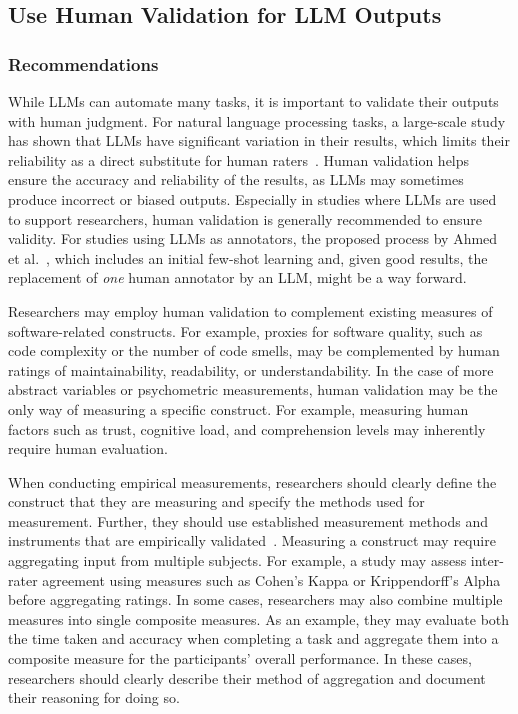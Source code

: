 \documentclass[11pt]{article}
\begin{document}
\subsection{Use Human Validation for LLM Outputs}

\subsubsection{Recommendations}

While LLMs can automate many tasks, it is important to validate their outputs with human judgment.
For natural language processing tasks, a large-scale study has shown that LLMs have significant variation in their results, which limits their reliability as a direct substitute for human raters~\cite{DBLP:journals/corr/abs-2406-18403}. 
Human validation helps ensure the accuracy and reliability of the results, as LLMs may sometimes produce incorrect or biased outputs.
Especially in studies where LLMs are used to support researchers, human validation is generally recommended to ensure validity.
For studies using LLMs as annotators, the proposed process by Ahmed et al.~\cite{DBLP:journals/corr/abs-2408-05534}, which includes an initial few-shot learning and, given good results, the replacement of \emph{one} human annotator by an LLM, might be a way forward.

Researchers may employ human validation to complement existing measures of software-related constructs.
For example, proxies for software quality, such as code complexity or the number of code smells, may be complemented by human ratings of maintainability, readability, or understandability.
In the case of more abstract variables or psychometric measurements, human validation may be the only way of measuring a specific construct.
For example, measuring human factors such as trust, cognitive load, and comprehension levels may inherently require human evaluation.

When conducting empirical measurements, researchers should clearly define the construct that they are measuring and specify the methods used for measurement.
Further, they should use established measurement methods and instruments that are empirically validated~\cite{DBLP:journals/fcomp/HoffmanMKL23, DBLP:conf/chi/PerrigSB23}.
Measuring a construct may require aggregating input from multiple subjects. 
For example, a study may assess inter-rater agreement using measures such as Cohen's Kappa or Krippendorff’s Alpha before aggregating ratings.
In some cases, researchers may also combine multiple measures into single composite measures.
As an example, they may evaluate both the time taken and accuracy when completing a task and aggregate them into a composite measure for the participants' overall performance.
In these cases, researchers should clearly describe their method of aggregation and document their reasoning for doing so.
\end{document}
